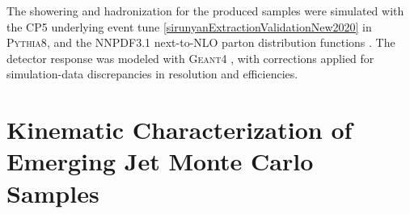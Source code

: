 The showering and hadronization for the produced samples were simulated with the CP5 underlying event tune \ref{sirunyanExtractionValidationNew2020} in \textsc{Pythia8}, and the NNPDF3.1 next-to-NLO parton distribution functions \cite{ballPartonDistributionsHighprecision2017}. The detector response was modeled with \textsc{Geant4} \cite{agostinelliGeant4aSimulationToolkit2003}, with corrections applied for simulation-data discrepancies in resolution and efficiencies. 

\section{Kinematic Characterization of Emerging Jet Monte Carlo Samples}